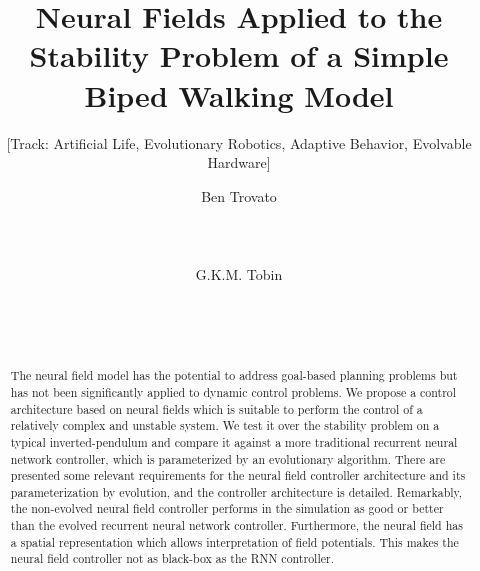 \documentclass{sig-alternate}
\begin{document}
%

\title{Neural Fields Applied to the Stability Problem
  of a Simple Biped Walking Model}
\subtitle{[Track: Artificial Life, Evolutionary Robotics, Adaptive Behavior, Evolvable Hardware]}

\author{
\alignauthor
Ben Trovato\\
       \\
       \\
       \\
\alignauthor
G.K.M. Tobin\\
       \\
       \\
       \\
}

\maketitle

\begin{abstract}
  The neural field model has the potential to address goal-based
  planning problems but has not been significantly applied to dynamic
  control problems. We propose a control architecture based on neural
  fields which is suitable to perform the control of a relatively
  complex and unstable system. We test it over the stability problem
  on a typical inverted-pendulum and compare it against a more
  traditional recurrent neural network controller, which is
  parameterized by an evolutionary algorithm. There are presented some
  relevant requirements for the neural field controller architecture
  and its parameterization by evolution, and the controller
  architecture is detailed. Remarkably, the non-evolved neural field
  controller performs in the simulation as good or better than the
  evolved recurrent neural network controller. Furthermore, the neural
  field has a spatial representation which allows interpretation of
  field potentials. This makes the neural field controller not as
  black-box as the RNN controller.
\end{abstract}
\end{document}
